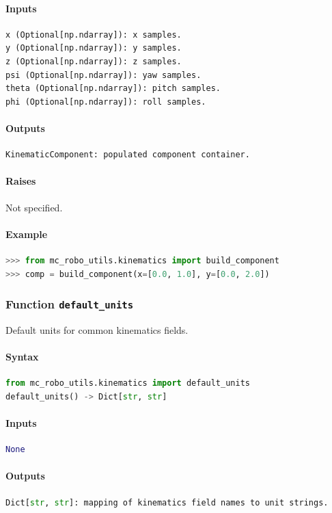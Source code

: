 \documentclass[11pt]{article}
\begin{document}
\paragraph{Inputs}
\begin{lstlisting}[language=Python]
x (Optional[np.ndarray]): x samples.
y (Optional[np.ndarray]): y samples.
z (Optional[np.ndarray]): z samples.
psi (Optional[np.ndarray]): yaw samples.
theta (Optional[np.ndarray]): pitch samples.
phi (Optional[np.ndarray]): roll samples.
\end{lstlisting}
\paragraph{Outputs}
\begin{lstlisting}[language=Python]
KinematicComponent: populated component container.
\end{lstlisting}
\paragraph{Raises}
Not specified.
\paragraph{Example}
\begin{lstlisting}[language=Python]
>>> from mc_robo_utils.kinematics import build_component
>>> comp = build_component(x=[0.0, 1.0], y=[0.0, 2.0])
\end{lstlisting}

\subsubsection{Function \texttt{default\_units}}
Default units for common kinematics fields.

\paragraph{Syntax}
\begin{lstlisting}[language=Python]
from mc_robo_utils.kinematics import default_units
default_units() -> Dict[str, str]
\end{lstlisting}
\paragraph{Inputs}
\begin{lstlisting}[language=Python]
None
\end{lstlisting}
\paragraph{Outputs}
\begin{lstlisting}[language=Python]
Dict[str, str]: mapping of kinematics field names to unit strings.
\end{lstlisting}
\end{document}
